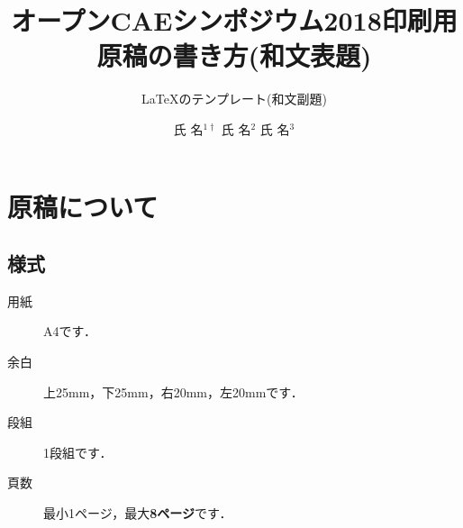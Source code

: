 \documentclass{ltjoc}
\title{オープンCAEシンポジウム2018印刷用原稿の書き方(和文表題)}
\subtitle{\LaTeX のテンプレート(和文副題)}
\author{%
氏 名$^{1\dagger}$%
\hspace{1\zw}%
氏 名$^{2}$%
\hspace{1\zw}%
氏 名$^{3}$%
}
\affiliation{%
${}^{1}$所属%
\hspace{1\zw}%
${}^{2}$所属%
\hspace{1\zw}%
${}^{3}$所属%
}
\begin{document}
\maketitle
\section{原稿について}
\subsection{様式}
\begin{description}
\item [用紙]
  A4です．
\item [余白]
  上25mm，下25mm，右20mm，左20mmです．
\item [段組]
  1段組です．
\item [頁数]
  最小1ページ，最大{\bfseries 8ページ}です．
\end{description}
\end{document}
